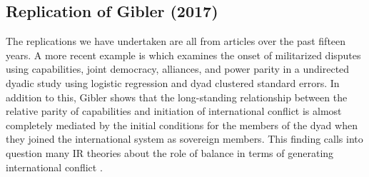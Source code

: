 \documentclass[12pt]{amsart}
\begin{document}
\subsection{Replication of Gibler (2017)}


The replications we have undertaken are all from articles over the past fifteen years.  A more recent example is \citet{gibler:2017} which examines the onset of militarized disputes using capabilities, joint democracy, alliances, and power parity in a undirected dyadic study using logistic regression and dyad clustered standard errors.   In addition to this, Gibler shows that the long-standing relationship between the relative parity of capabilities and initiation of international conflict is almost completely mediated by the initial conditions for the members of the dyad when they joined the international system as sovereign members. This finding calls into question many IR theories about the role of balance in terms of generating international conflict \citep{organski:1958}.
\end{document}
